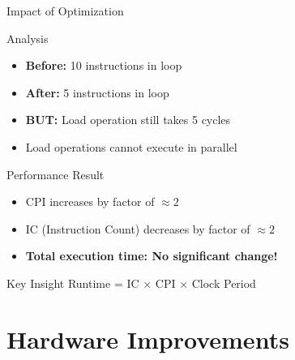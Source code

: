 \documentclass[aspectratio=169,12pt]{beamer}
\begin{document}
\begin{frame}{Impact of Optimization}
\begin{block}{Analysis}
\begin{itemize}
    \item \textbf{Before:} 10 instructions in loop
    \item \textbf{After:} 5 instructions in loop
    \item \textbf{BUT:} Load operation still takes 5 cycles
    \item Load operations cannot execute in parallel
\end{itemize}
\end{block}

\begin{alertblock}{Performance Result}
\begin{itemize}
    \item CPI increases by factor of $\approx 2$
    \item IC (Instruction Count) decreases by factor of $\approx 2$
    \item \textbf{Total execution time: No significant change!}
\end{itemize}
\end{alertblock}

\begin{block}{Key Insight}
Runtime = IC × CPI × Clock Period
\end{block}
\end{frame}

\section{Hardware Improvements}
\end{document}
